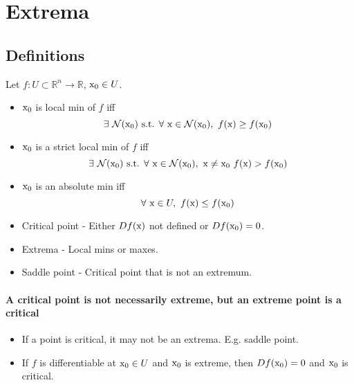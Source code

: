 \chapter*{Extrema}
\section*{Definitions}
Let $f:U\subset \mathbb{R}^n\to\mathbb{R}$, $\textrm{x}_0 \in U$. %
\begin{itemize}
    \itemsep 0em
    \item $\textrm{x}_0$ is local min of $f$ iff
    $$\exists~ \mathcal{N}(\textrm{x}_0) \textrm{ s.t. } \forall~\textrm{x}\in \mathcal{N}(\textrm{x}_0),~ f(\textrm{x})\geq f(\textrm{x}_0)$$
    \item $\textrm{x}_0$ is a strict local min of $f$ iff
    $$\exists~ \mathcal{N}(\textrm{x}_0) \textrm{ s.t. } \forall~\textrm{x}\in \mathcal{N}(\textrm{x}_0),~ \textrm{x} \neq \textrm{x}_0~ f(\textrm{x}) > f(\textrm{x}_0)$$
    \item $\textrm{x}_0$ is an absolute min iff
    $$\forall~ \textrm{x}\in U,~f(\textrm{x})\leq f(\textrm{x}_0)$$
    \item Critical point - 
    Either $Df(\textrm{x})$ not defined or $Df(\textrm{x}_0)=0$.
    \item Extrema - Local mins or maxes.
    \item Saddle point - Critical point that is not an extremum.
\end{itemize}
\subsubsection*{A critical point is not necessarily extreme, but an extreme point is a critical}
\begin{itemize}
    \itemsep 0em
    \item If a point is critical, it may not be an extrema. E.g. saddle point.
    \item If $f$ is differentiable at $\textrm{x}_0 \in U$ and $\textrm{x}_0$ is extreme, then $Df(\textrm{x}_0)=0$ and $\textrm{x}_0$ is critical.
\end{itemize}


